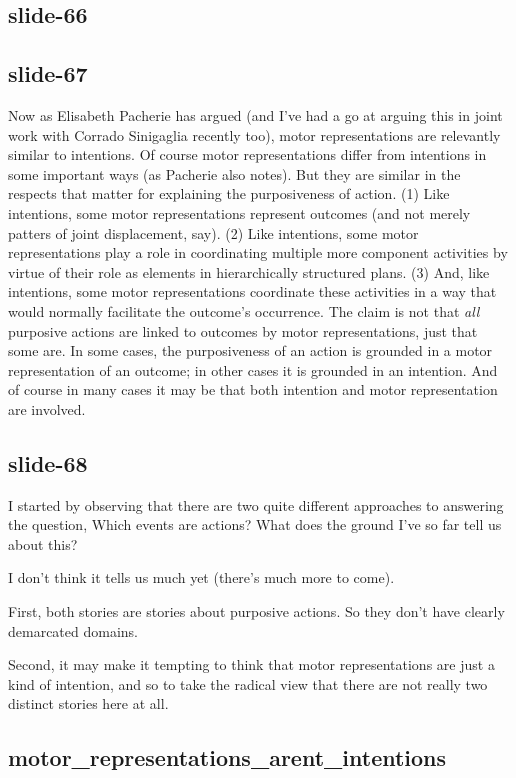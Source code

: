 \documentclass[12pt,\papersize]{extarticle}
\begin{document}
\subsection{slide-66}
 
\subsection{slide-67}
Now as Elisabeth Pacherie has argued (and I’ve had a go at arguing this in joint work with Corrado Sinigaglia recently too),
motor representations are relevantly similar to intentions.
Of course motor representations differ from intentions in some important ways (as Pacherie also notes).
But they are similar in the respects that matter for explaining the purposiveness of action.
(1) Like intentions, some motor representations represent outcomes (and not merely patters of joint displacement, say).
(2) Like intentions, some motor representations play a role in coordinating multiple more component activities by virtue of their role as elements in hierarchically structured plans.
(3) And, like intentions, some motor representations coordinate these activities in a way that would normally facilitate the outcome’s occurrence.
The claim is not that \emph{all} purposive actions are linked to outcomes by motor representations, just that some are.
In some cases, the purposiveness of an action is grounded in a motor representation of an outcome; in other cases it is grounded in an intention.
And of course in many cases it may be that both intention and motor representation are involved.
 
\subsection{slide-68}
I started by observing that there are two quite different approaches to
answering the question, Which events are actions?
What does the ground I’ve so far tell us about this?
 
I don’t think it tells us much yet (there’s much more to come).
 
First, both stories are stories about purposive actions.
So they don’t have clearly demarcated domains.
 
Second, it may make it tempting to think that motor representations are just a kind of intention,
and so to take the radical view that there are not really two distinct stories here at all.
 
\subsection{motor\_representations\_arent\_intentions}
 
\end{document}
